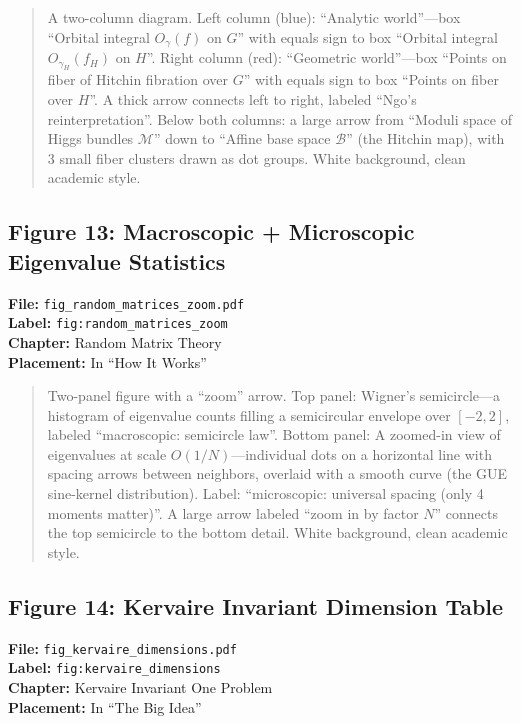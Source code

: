 \begin{quote}
A two-column diagram. Left column (blue): ``Analytic world''---box ``Orbital integral $O_\gamma(f)$ on $G$'' with equals sign to box ``Orbital integral $O_{\gamma_H}(f_H)$ on $H$''. Right column (red): ``Geometric world''---box ``Points on fiber of Hitchin fibration over $G$'' with equals sign to box ``Points on fiber over $H$''. A thick arrow connects left to right, labeled ``Ngo's reinterpretation''. Below both columns: a large arrow from ``Moduli space of Higgs bundles $\mathcal{M}$'' down to ``Affine base space $\mathcal{B}$'' (the Hitchin map), with 3 small fiber clusters drawn as dot groups. White background, clean academic style.
\end{quote}

\subsection*{Figure 13: Macroscopic + Microscopic Eigenvalue Statistics}
\textbf{File:} \texttt{fig\_random\_matrices\_zoom.pdf} \\
\textbf{Label:} \texttt{fig:random\_matrices\_zoom} \\
\textbf{Chapter:} Random Matrix Theory \\
\textbf{Placement:} In ``How It Works''

\begin{quote}
Two-panel figure with a ``zoom'' arrow. Top panel: Wigner's semicircle---a histogram of eigenvalue counts filling a semicircular envelope over $[-2, 2]$, labeled ``macroscopic: semicircle law''. Bottom panel: A zoomed-in view of eigenvalues at scale $O(1/N)$---individual dots on a horizontal line with spacing arrows between neighbors, overlaid with a smooth curve (the GUE sine-kernel distribution). Label: ``microscopic: universal spacing (only 4 moments matter)''. A large arrow labeled ``zoom in by factor $N$'' connects the top semicircle to the bottom detail. White background, clean academic style.
\end{quote}

\subsection*{Figure 14: Kervaire Invariant Dimension Table}
\textbf{File:} \texttt{fig\_kervaire\_dimensions.pdf} \\
\textbf{Label:} \texttt{fig:kervaire\_dimensions} \\
\textbf{Chapter:} Kervaire Invariant One Problem \\
\textbf{Placement:} In ``The Big Idea''

